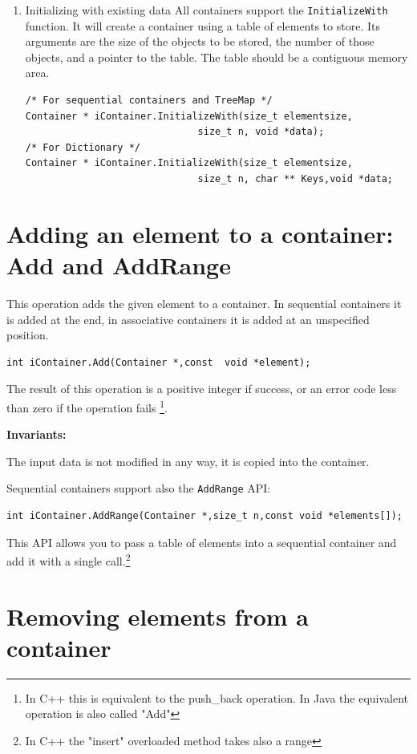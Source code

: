 \documentclass[12pt,a4paper,openany]{memoir} %
\newcommand{\Const}{
{\par\noindent \textbf{Invariants:}\noindent}
}
\begin{document}
\begin{enumerate}
\item Initializing with existing data
All containers support the \verb,InitializeWith, function. It will create a container using a table of elements to store. Its arguments are the size of 
the objects to be stored, the number of those objects, and a pointer to the table. The table should be a contiguous memory area.
\begin{verbatim}
/* For sequential containers and TreeMap */
Container * iContainer.InitializeWith(size_t elementsize,
                              size_t n, void *data);
/* For Dictionary */
Container * iContainer.InitializeWith(size_t elementsize,
                              size_t n, char ** Keys,void *data;
\end{verbatim}


\end{enumerate}
\section{Adding an element to a container: Add and AddRange}
This operation adds the given element to a container. In sequential containers it is added at the end, in associative containers it is added at an unspecified position.
\begin{verbatim}
int iContainer.Add(Container *,const  void *element);
\end{verbatim}
The result of this operation is a positive integer if success, or an error code less than zero if the operation fails \footnote{In C++ this is equivalent to the push\_back operation. In Java the equivalent operation is also called "Add"}.
\Const The input data is not modified in any way, it is copied into the container.

Sequential containers support also the \texttt{AddRange} API:
\begin{verbatim}
int iContainer.AddRange(Container *,size_t n,const void *elements[]);
\end{verbatim}
This API allows you to pass a table of elements into a sequential container and add it with a single call.\footnote{In C++ the "insert" overloaded method takes also a range}
\section{Removing elements from a container}
\end{document}
